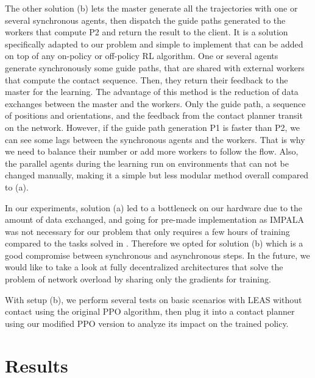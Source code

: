 The other solution (b) lets the master generate all the trajectories with one or several synchronous agents, then dispatch the guide paths generated to the workers that compute P2 and return the result to the client.
It is a solution specifically adapted to our problem and simple to implement that can be added on top of any on-policy or off-policy RL algorithm. 
One or several agents generate synchronously some guide paths, that are shared with external workers that compute the contact sequence. Then, they return their feedback to the master for the learning. 
The advantage of this method is the reduction of data exchanges between the master and the workers. Only the guide path, a sequence of positions and orientations, and the feedback from the contact planner transit on the network.
However, if the guide path generation P1 is faster than P2, we can see some lags between the synchronous agents and the workers. That is why we need to balance their number or add more workers to follow the flow. Also, the parallel agents during the learning run on environments that can not be changed manually, making it a simple but less modular method overall compared to (a).

In our experiments, solution (a) led to a bottleneck on our hardware due to the amount of data exchanged, and going for pre-made implementation as IMPALA was not necessary for our problem that only requires a few hours of training compared to the tasks solved in \cite{impala2018, openai2019dota}.
Therefore we opted for solution (b) which is a good compromise between synchronous and asynchronous steps.
In the future, we would like to take a look at fully decentralized architectures \cite{DD_PPO} that solve the problem of network overload by sharing only the gradients for training.

With setup (b), we perform several tests on basic scenarios with LEAS without contact using the original PPO algorithm, then plug it into a contact planner using our modified PPO version to analyze its impact on the trained policy.


\section{Results\label{subsec:leas-results}}

